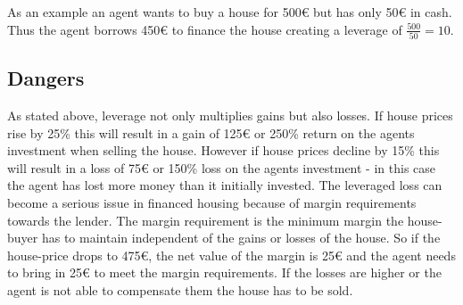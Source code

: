 \documentclass[../Bachelorarbeit.tex]{subfiles}
\begin{document}
As an example an agent wants to buy a house for 500\euro{} but has only 50\euro{} in cash. Thus the agent borrows 450\euro{} to finance the house creating a leverage of $\frac{500}{50} = 10$.

\subsection{Dangers}
As stated above, leverage not only multiplies gains but also losses. If house prices rise by 25\% this will result in a gain of 125\euro{} or 250\% return on the agents investment when selling the house. However if house prices decline by 15\% this will result in a loss of 75\euro{} or 150\% loss on the agents investment - in this case the agent has lost more money than it initially invested. The leveraged loss can become a serious issue in financed housing because of margin requirements towards the lender. The margin requirement is the minimum margin the house-buyer has to maintain independent of the gains or losses of the house. So if the house-price drops to 475\euro{}, the net value of the margin is 25\euro{} and the agent needs to bring in 25\euro{} to meet the margin requirements. If the losses are higher or the agent is not able to compensate them the house has to be sold.


\end{document}
